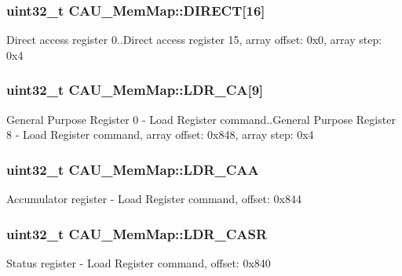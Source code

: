 \subsubsection[{D\+I\+R\+E\+C\+T}]{\setlength{\rightskip}{0pt plus 5cm}uint32\+\_\+t C\+A\+U\+\_\+\+Mem\+Map\+::\+D\+I\+R\+E\+C\+T\mbox{[}16\mbox{]}}\label{struct_c_a_u___mem_map_aedfa93977c4f622bd7bc6c223a02f9c2}
Direct access register 0..Direct access register 15, array offset\+: 0x0, array step\+: 0x4 \hypertarget{struct_c_a_u___mem_map_ad53398a7dd146307c3fc7aeb448a42b6}{}
\subsubsection[{L\+D\+R\+\_\+\+C\+A}]{\setlength{\rightskip}{0pt plus 5cm}uint32\+\_\+t C\+A\+U\+\_\+\+Mem\+Map\+::\+L\+D\+R\+\_\+\+C\+A\mbox{[}9\mbox{]}}\label{struct_c_a_u___mem_map_ad53398a7dd146307c3fc7aeb448a42b6}
General Purpose Register 0 -\/ Load Register command..General Purpose Register 8 -\/ Load Register command, array offset\+: 0x848, array step\+: 0x4 \hypertarget{struct_c_a_u___mem_map_aa1bd9997f3c316e126979eb1a249a53b}{}
\subsubsection[{L\+D\+R\+\_\+\+C\+A\+A}]{\setlength{\rightskip}{0pt plus 5cm}uint32\+\_\+t C\+A\+U\+\_\+\+Mem\+Map\+::\+L\+D\+R\+\_\+\+C\+A\+A}\label{struct_c_a_u___mem_map_aa1bd9997f3c316e126979eb1a249a53b}
Accumulator register -\/ Load Register command, offset\+: 0x844 \hypertarget{struct_c_a_u___mem_map_ae256965798409e23f35be1d69b7d4918}{}
\subsubsection[{L\+D\+R\+\_\+\+C\+A\+S\+R}]{\setlength{\rightskip}{0pt plus 5cm}uint32\+\_\+t C\+A\+U\+\_\+\+Mem\+Map\+::\+L\+D\+R\+\_\+\+C\+A\+S\+R}\label{struct_c_a_u___mem_map_ae256965798409e23f35be1d69b7d4918}
Status register -\/ Load Register command, offset\+: 0x840 \hypertarget{struct_c_a_u___mem_map_a9c1999a6a31be1422acd1d33f67f2a9e}{}
